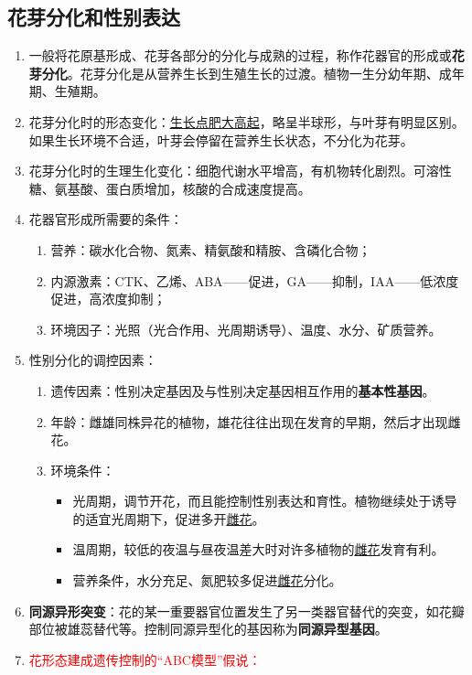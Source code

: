 \subsection{花芽分化和性别表达}
\begin{enumerate}
    \item 一般将花原基形成、花芽各部分的分化与成熟的过程，称作花器官的形成或\textbf{花芽分化}。花芽分化是从营养生长到生殖生长的过渡。植物一生分幼年期、成年期、生殖期。
    \item 花芽分化时的形态变化：\uline{生长点肥大高起}，略呈半球形，与叶芽有明显区别。如果生长环境不合适，叶芽会停留在营养生长状态，不分化为花芽。
    \item 花芽分化时的生理生化变化：细胞代谢水平增高，有机物转化剧烈。可溶性糖、氨基酸、蛋白质增加，核酸的合成速度提高。
    \item 花器官形成所需要的条件：
    \begin{enumerate}
        \item 营养：碳水化合物、氮素、精氨酸和精胺、含磷化合物；
        \item 内源激素：CTK、乙烯、ABA——促进，GA——抑制，IAA——低浓度促进，高浓度抑制；
        \item 环境因子：光照（光合作用、光周期诱导）、温度、水分、矿质营养。
    \end{enumerate}
    \item 性别分化的调控因素：
    \begin{enumerate}
        \item 遗传因素：性别决定基因及与性别决定基因相互作用的\textbf{基本性基因}。
        \item 年龄：雌雄同株异花的植物，雄花往往出现在发育的早期，然后才出现雌花。 
        \item 环境条件：
        \begin{itemize}
            \item 光周期，调节开花，而且能控制性别表达和育性。植物继续处于诱导的适宜光周期下，促进多开\uline{雌花}。
            \item 温周期，较低的夜温与昼夜温差大时对许多植物的\uline{雌花}发育有利。
            \item 营养条件，水分充足、氮肥较多促进\uline{雌花}分化。
        \end{itemize}
    \end{enumerate}
    \item \textbf{同源异形突变}：花的某一重要器官位置发生了另一类器官替代的突变，如花瓣部位被雄蕊替代等。控制同源异型化的基因称为\textbf{同源异型基因}。
    \item \textcolor{red}{花形态建成遗传控制的“ABC模型”假说：}

\end{enumerate}
